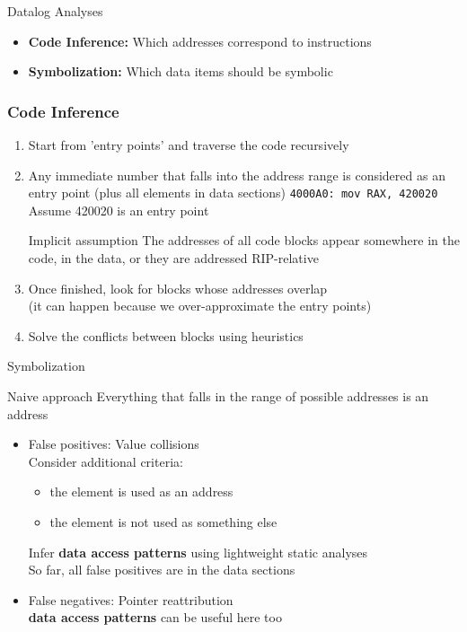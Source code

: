 \documentclass[]{beamer}
\begin{document}
\begin{frame}{Datalog Analyses}

  \begin{itemize}
  \item \textbf{Code Inference:} Which addresses correspond to instructions
  \item \textbf{Symbolization:} Which data items should be symbolic
  \end{itemize}
\end{frame}    
\begin{frame}
  \frametitle{Code Inference}
  \begin{enumerate}
  \item Start from 'entry points' and traverse the code recursively
    
  \item Any immediate number that falls into the address range is considered as an entry point
    (plus all elements in data sections)
    \pause
    {\color{dblue}\lstinline{4000A0: mov RAX, 420020}}\\
    Assume 420020 is an entry point
    \pause
    \begin{block}{Implicit assumption}
      The addresses of all code blocks appear somewhere in the code, in the data,
      or they are addressed RIP-relative
    \end{block}
\pause
  \item Once finished, look for blocks whose addresses overlap\\
    (it can happen because we over-approximate the entry points)
  \item Solve the conflicts between blocks using heuristics
  \end{enumerate}
\end{frame}
\begin{frame}{Symbolization}
  \begin{block}{Naive approach}
    Everything that falls in the range of
    possible addresses is an address
    \end{block}
  \begin{itemize}
  \item False positives: Value collisions\\
    Consider additional criteria:
    \begin{itemize}
     \item the element is used as an address
     \item the element is not used as something else
    \end{itemize}
    Infer \textbf{data access patterns} using lightweight static analyses\\
    \alert{So far, all false positives are in the data sections}
  \item False negatives: Pointer reattribution\\
    \textbf{data access patterns} can be useful here too
  \end{itemize}
\end{frame}
\end{document}
